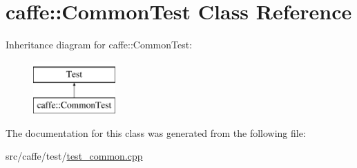 \hypertarget{classcaffe_1_1_common_test}{\section{caffe\+:\+:Common\+Test Class Reference}
\label{classcaffe_1_1_common_test}
}
Inheritance diagram for caffe\+:\+:Common\+Test\+:\begin{figure}[H]
\begin{center}
\leavevmode
\includegraphics[height=2.000000cm]{classcaffe_1_1_common_test}
\end{center}
\end{figure}


The documentation for this class was generated from the following file\+:\begin{DoxyCompactItemize}
\item 
src/caffe/test/\hyperlink{test__common_8cpp}{test\+\_\+common.\+cpp}\end{DoxyCompactItemize}
